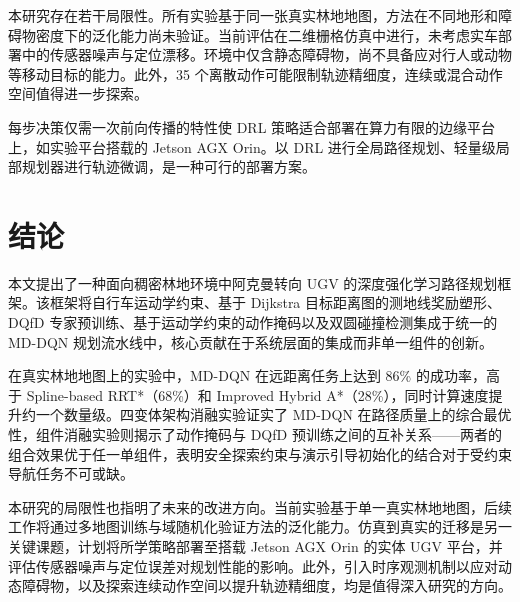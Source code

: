 \documentclass{iopjournal}
\begin{document}
本研究存在若干局限性。所有实验基于同一张真实林地地图，方法在不同地形和障碍物密度下的泛化能力尚未验证。当前评估在二维栅格仿真中进行，未考虑实车部署中的传感器噪声与定位漂移。环境中仅含静态障碍物，尚不具备应对行人或动物等移动目标的能力。此外，35 个离散动作可能限制轨迹精细度，连续或混合动作空间值得进一步探索。

每步决策仅需一次前向传播的特性使 DRL 策略适合部署在算力有限的边缘平台上，如实验平台搭载的 Jetson AGX Orin。以 DRL 进行全局路径规划、轻量级局部规划器进行轨迹微调，是一种可行的部署方案。

\section{结论}\label{sec:conclusion}

本文提出了一种面向稠密林地环境中阿克曼转向 UGV 的深度强化学习路径规划框架。该框架将自行车运动学约束、基于 Dijkstra 目标距离图的测地线奖励塑形、DQfD 专家预训练、基于运动学约束的动作掩码以及双圆碰撞检测集成于统一的 MD-DQN 规划流水线中，核心贡献在于系统层面的集成而非单一组件的创新。

在真实林地地图上的实验中，MD-DQN 在远距离任务上达到 86\% 的成功率，高于 Spline-based RRT*（68\%）和 Improved Hybrid A*（28\%），同时计算速度提升约一个数量级。四变体架构消融实验证实了 MD-DQN 在路径质量上的综合最优性，组件消融实验则揭示了动作掩码与 DQfD 预训练之间的互补关系——两者的组合效果优于任一单组件，表明安全探索约束与演示引导初始化的结合对于受约束导航任务不可或缺。

本研究的局限性也指明了未来的改进方向。当前实验基于单一真实林地地图，后续工作将通过多地图训练与域随机化验证方法的泛化能力。仿真到真实的迁移是另一关键课题，计划将所学策略部署至搭载 Jetson AGX Orin 的实体 UGV 平台，并评估传感器噪声与定位误差对规划性能的影响。此外，引入时序观测机制以应对动态障碍物，以及探索连续动作空间以提升轨迹精细度，均是值得深入研究的方向。



\end{document}
